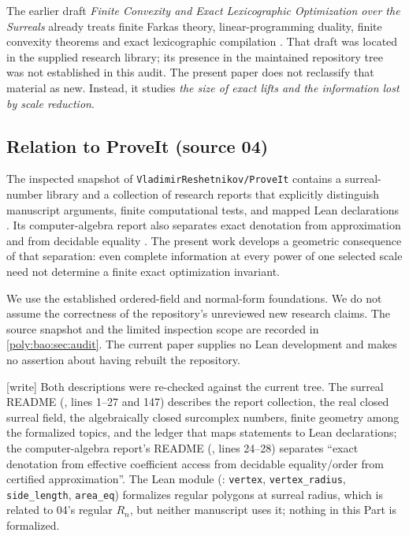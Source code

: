 \documentclass[11pt,a4paper]{article}
\numberwithin{equation}{section}
\theoremstyle{plain}
\newcommand{\wtag}{\textup{[write]}}%
\begin{document}

The earlier draft \emph{Finite Convexity and Exact Lexicographic Optimization
over the Surreals} already treats finite Farkas theory, linear-programming
duality, finite convexity theorems and exact lexicographic compilation
\cite{ic:previous}. That draft was located in the supplied research library;
its presence in the maintained repository tree was not established in this
audit. The present paper does not reclassify that material as new. Instead,
it studies \emph{the size of exact lifts and the information lost by scale
reduction}.

\subsection{Relation to ProveIt (source 04)}
The inspected snapshot of \texttt{VladimirReshetnikov/ProveIt} contains a
surreal-number library and a collection of research reports that explicitly
distinguish manuscript arguments, finite computational tests, and mapped
Lean declarations \cite{bao:Repo,bao:RepoGuide}. Its computer-algebra report also
separates exact denotation from approximation and from decidable equality
\cite{bao:RepoCAS}. The present work develops a geometric consequence of that
separation: even complete information at every power of one selected scale
need not determine a finite exact optimization invariant.

We use the established ordered-field and normal-form foundations. We do not
assume the correctness of the repository's unreviewed new research claims.
The source snapshot and the limited inspection scope are recorded in
\cref{poly:bao:sec:audit}. The current paper supplies no Lean development and makes
no assertion about having rebuilt the repository.

\wtag{} Both descriptions were re-checked against the current tree. The
surreal README (, lines 1--27
and 147) describes the report collection, the real closed surreal field,
the algebraically closed surcomplex numbers, finite geometry among the
formalized topics, and the ledger that maps statements to Lean
declarations; the computer-algebra report's README
(,
lines 24--28) separates ``exact denotation from effective coefficient
access from decidable equality/order from certified approximation''. The
Lean module 
(:
\texttt{vertex}, \texttt{vertex\_radius}, \texttt{side\_length},
\texttt{area\_eq}) formalizes regular polygons at surreal radius, which is
related to 04's regular $R_n$, but neither manuscript uses it; nothing in
this Part is formalized.
\end{document}
